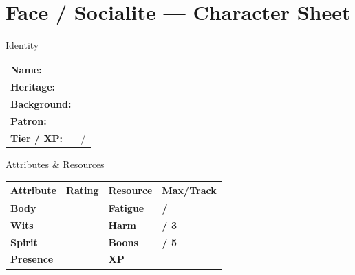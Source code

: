 \documentclass[10pt]{article}
\begin{document}
\newpage

\section*{Face / Socialite --- Character Sheet}

\begin{minipage}[t]{0.48\linewidth}
    \begin{charbox}{Identity}
        \begin{tabular}{p{2.5cm} p{5cm}}
            \textbf{Name:} & \underline{\hspace{4cm}} \\
            \textbf{Heritage:} & \underline{\hspace{4cm}} \\
            \textbf{Background:} & \underline{\hspace{4cm}} \\
            \textbf{Patron:} & \underline{\hspace{4cm}} \\
            \textbf{Tier / XP:} & \underline{\hspace{2cm}} / \underline{\hspace{2cm}} \\
        \end{tabular}
    \end{charbox}
    
    \vspace{0.5em}
    
    \begin{charbox}{Attributes \& Resources}
        \begin{tabular}{>{\bfseries}p{2.5cm} >{\bfseries}p{1.5cm} >{\bfseries}p{2.5cm} >{\bfseries}p{1.5cm}}
            \toprule
            \textbf{Attribute} & \textbf{Rating} & \textbf{Resource} & \textbf{Max/Track} \\
            \midrule
            Body & \underline{\hspace{1.5cm}} & Fatigue & \underline{\hspace{1.5cm}} / \underline{\hspace{1.5cm}} \\
            Wits & \underline{\hspace{1.5cm}} & Harm & \underline{\hspace{1.5cm}} / 3 \\
            Spirit & \underline{\hspace{1.5cm}} & Boons & \underline{\hspace{1.5cm}} / 5 \\
            Presence & \underline{\hspace{1.5cm}} & XP & \underline{\hspace{1.5cm}} \\
            \bottomrule
        \end{tabular}
    \end{charbox}
    

\end{minipage}
\end{document}
